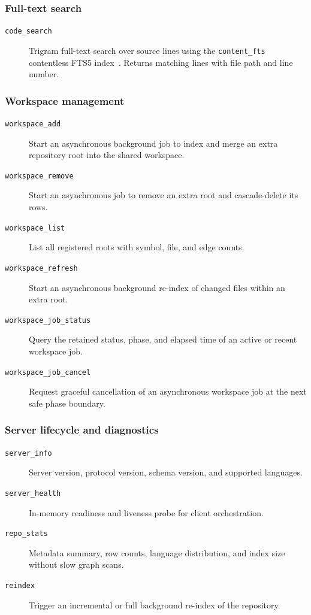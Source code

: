 \subsubsection{Full-text search}

\begin{description}
  \item[\texttt{code\_search}] Trigram full-text search over source lines
        using the \texttt{content\_fts} contentless FTS5 index~\cite{cox2012trigram}.
        Returns matching lines with file path and line number.
\end{description}

\subsubsection{Workspace management}

\begin{description}
  \item[\texttt{workspace\_add}] Start an asynchronous background job to index
        and merge an extra repository root into the shared workspace.
  \item[\texttt{workspace\_remove}] Start an asynchronous job to remove an extra
        root and cascade-delete its rows.
  \item[\texttt{workspace\_list}] List all registered roots with symbol, file,
        and edge counts.
  \item[\texttt{workspace\_refresh}] Start an asynchronous background re-index of
        changed files within an extra root.
  \item[\texttt{workspace\_job\_status}] Query the retained status, phase, and
        elapsed time of an active or recent workspace job.
  \item[\texttt{workspace\_job\_cancel}] Request graceful cancellation of an
        asynchronous workspace job at the next safe phase boundary.
\end{description}

\subsubsection{Server lifecycle and diagnostics}

\begin{description}
  \item[\texttt{server\_info}] Server version, protocol version, schema version,
        and supported languages.
  \item[\texttt{server\_health}] In-memory readiness and liveness probe for
        client orchestration.
  \item[\texttt{repo\_stats}] Metadata summary, row counts, language
        distribution, and index size without slow graph scans.
  \item[\texttt{reindex}] Trigger an incremental or full background re-index of
        the repository.
\end{description}
